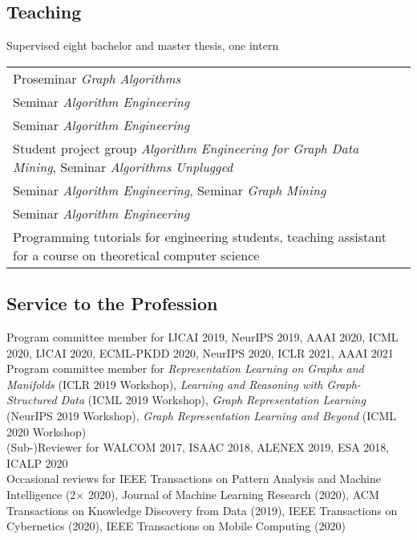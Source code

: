 \documentclass[11pt, a4paper]{scrartcl}
\begin{document}
\subsection*{Teaching}

Supervised eight bachelor and master thesis, one intern\\

\begin{tabular}{p{12.0cm}}
Proseminar \emph{Graph Algorithms}\\
Seminar \emph{Algorithm Engineering}\\
Seminar \emph{Algorithm Engineering}\\
Student project group \emph{Algorithm Engineering for Graph Data Mining}, Seminar \emph{Algorithms Unplugged}\\
Seminar \emph{Algorithm Engineering}, Seminar \emph{Graph Mining}\\
 Seminar \emph{Algorithm Engineering}\\
 Programming tutorials for engineering students, teaching assistant for a course on theoretical computer science\\
\end{tabular}

\subsection*{Service to the Profession}


Program committee member for IJCAI 2019, NeurIPS  2019, AAAI 2020, ICML 2020, IJCAI 2020, ECML-PKDD 2020,  NeurIPS 2020, ICLR 2021, AAAI 2021\\

Program committee member for \emph{Representation Learning on Graphs and Manifolds} (ICLR 2019 Workshop), \emph{Learning and Reasoning with Graph-Structured Data} (ICML 2019 Workshop), \emph{Graph Representation Learning} (NeurIPS 2019 Workshop), \emph{Graph Representation Learning and Beyond} (ICML 2020 Workshop)\\

(Sub-)Reviewer for WALCOM 2017, ISAAC 2018, ALENEX 2019, ESA 2018, ICALP 2020 \\

Occasional reviews for IEEE Transactions on Pattern Analysis and Machine Intelligence (2$\times$ 2020), Journal of Machine Learning Research (2020), ACM Transactions on Knowledge Discovery from Data (2019), IEEE Transactions on Cybernetics (2020), IEEE Transactions on Mobile Computing (2020)\\
\end{document}
